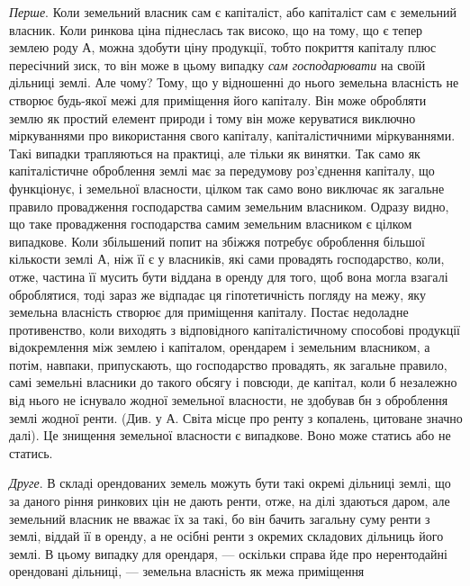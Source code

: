 \emph{Перше}. Коли земельний власник сам є капіталіст, або капіталіст сам є
земельний власник. Коли ринкова ціна піднеслась так високо, що на тому,
що є тепер землею роду А, можна здобути ціну продукції, тобто покриття капіталу
плюс пересічний зиск, то він може в цьому випадку \emph{сам господарювати}
на своїй дільниці землі. Але чому? Тому, що у відношенні до нього земельна
власність не створює будь-якої межі для приміщення його капіталу.
Він може обробляти землю як простий елемент природи і тому він може керуватися
виключно міркуваннями про використання свого капіталу, капіталістичними
міркуваннями. Такі випадки трапляються на практиці, але тільки як винятки.
Так само як капіталістичне оброблення землі має за передумову роз’єднення капіталу,
що функціонує, і земельної власности, цілком так само воно виключає як
загальне правило провадження господарства самим земельним власником. Одразу
видно, що таке провадження господарства самим земельним власником є цілком
випадкове. Коли збільшений попит на збіжжя потребує оброблення більшої кількости
землі А, ніж її є у власників, які сами провадять господарство, коли, отже,
частина її мусить бути віддана в оренду для того, щоб вона могла взагалі оброблятися,
тоді зараз же відпадає ця гіпотетичність погляду на межу, яку земельна
власність створює для приміщення капіталу. Постає недоладне противенство,
коли виходять з відповідного капіталістичному способові продукції відокремлення
між землею і капіталом, орендарем і земельним власником, а потім,
навпаки, припускають, що господарство провадять, як загальне правило, самі
земельні власники до такого обсягу і повсюди, де капітал, коли б незалежно
від нього не існувало жодної земельної власности, не здобував бн з оброблення
землі жодної ренти. (Див. у А. Світа місце про ренту з копалень, цитоване
значно далі). Це знищення земельної власности є випадкове. Воно може статись
або не статись.

\emph{Друге}. В складі орендованих земель можуть бути такі окремі дільниці
землі, що за даного ріння ринкових цін не дають ренти, отже, на ділі здаються
даром, але земельний власник не вважає їх за такі, бо він бачить загальну суму
ренти з землі, віддай її в оренду, а не осібні ренти з окремих складових дільниць
його землі. В цьому випадку для орендаря, — оскільки справа йде про
нерентодайні орендовані дільниці, — земельна власність як межа приміщення
\parbreak{}  %
